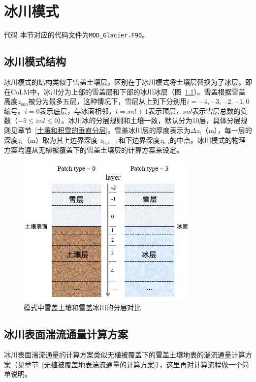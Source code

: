 \chapter{冰川模式}
\begin{mymdframed}{代码}
  本节对应的代码文件为\texttt{MOD\_Glacier.F90}。
\end{mymdframed}
\section{冰川模式结构}
冰川模式的结构类似于雪盖土壤层，区别在于冰川模式将土壤层替换为了冰层。即在CoLM中，冰川分为上部的雪盖层和下部的冰川冰层（图~\ref{fig:模式中雪盖土壤和雪盖冰川的分层对比}）。雪盖根据雪盖高度$z_{\mathrm{sno}}$被分为最多五层，这种情况下，雪层从上到下分别用$i=-4,-3,-2,-1,0$编号。$i=0$表示底层，与冰面相邻，$i=snl+1$表示顶层，$snl$表示雪层总数的负数（$-5\leqslant snl\leqslant 0$）。冰川冰的分层规则和土壤一致，默认分为10层，具体分层规则见章节~\ref{土壤和积雪的垂直分层}。雪盖冰川层的厚度表示为$\Delta z_i$（m），每一层的深度$z_i$（m）取为其上边界深度 $z_{\mathrm{h},i-1}$和下边界深度$z_{\mathrm{h},i}$的中点。冰川模式的物理方案均遵从无植被覆盖下的雪盖土壤层的计算方案来设定。

{
  \begin{figure}[htbp]
    \centering
    \includegraphics[width=0.8\textwidth]{Figures/冰川模式/模式中雪盖土壤和雪盖冰川的分层对比.jpg}
    \caption{模式中雪盖土壤和雪盖冰川的分层对比}
    \label{fig:模式中雪盖土壤和雪盖冰川的分层对比}
  \end{figure}
}

\section{冰川表面湍流通量计算方案}
冰川表面湍流通量的计算方案类似无植被覆盖下的雪盖土壤地表的湍流通量计算方案（见章节~\ref{无植被覆盖地表湍流通量的计算方案}），这里再对计算流程做一个简单说明。

